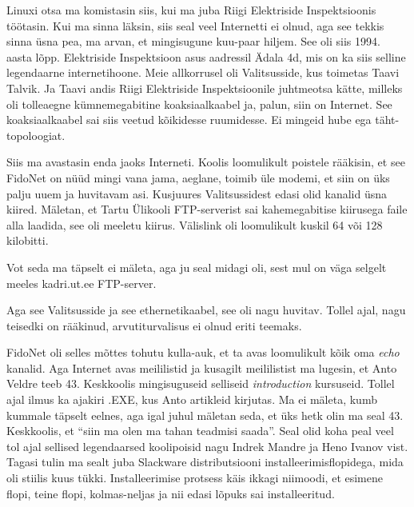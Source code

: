 
Linuxi otsa ma komistasin siis, kui ma juba Riigi Elektriside 
Inspektsioonis töötasin. Kui ma sinna 
läksin, siis seal veel Internetti ei olnud, aga see tekkis sinna üsna pea, ma 
arvan, et mingisugune kuu-paar hiljem. See oli siis 1994. aasta lõpp.  
Elektriside Inspektsioon asus aadressil Ädala 4d, mis on ka siis selline 
legendaarne internetihoone.  Meie allkorrusel oli 
Valitsusside, kus toimetas Taavi Talvik. Ja Taavi andis Riigi Elektriside Inspektsioonile juhtmeotsa kätte, 
milleks oli  tolleaegne kümnemegabitine koaksiaalkaabel ja, palun, siin on 
Internet. See koaksiaalkaabel sai siis veetud kõikidesse ruumidesse. Ei mingeid 
hube ega täht-topoloogiat.

Siis ma avastasin enda jaoks Interneti. Koolis loomulikult poistele rääkisin, et 
see FidoNet on nüüd mingi  vana jama, aeglane, toimib üle modemi, et siin on 
üks palju uuem ja huvitavam asi. Kusjuures  Valitsussidest edasi olid kanalid 
üsna kiired. Mäletan, et Tartu Ülikooli FTP-serverist sai kahemegabitise 
kiirusega faile alla laadida, see oli  meeletu kiirus. Välislink oli 
loomulikult kuskil 64 või 128 kilobitti. 


Vot seda ma täpselt ei mäleta, aga ju seal midagi oli, sest mul on väga selgelt 
meeles kadri.ut.ee  FTP-server. 

Aga see Valitsusside ja see ethernetikaabel, see oli nagu 
huvitav. Tollel ajal, nagu teisedki on rääkinud, arvutiturvalisus ei olnud 
eriti teemaks. 

FidoNet oli selles mõttes tohutu kulla-auk, et ta avas loomulikult kõik oma  
\emph{echo} kanalid. Aga Internet avas meililistid ja kusagilt meililistist ma 
lugesin, et Anto Veldre teeb 43. 
Keskkoolis mingisuguseid selliseid 
\emph{introduction} kursuseid. Tollel ajal ilmus ka ajakiri .EXE, 
kus Anto artikleid kirjutas. Ma ei mäleta, kumb kummale täpselt eelnes, aga 
igal juhul mäletan seda, et üks hetk olin ma seal 43. Keskkoolis, et 
\enquote{siin ma olen ma tahan teadmisi saada}. Seal olid koha peal veel tol 
ajal sellised legendaarsed koolipoisid nagu Indrek Mandre ja Heno Ivanov vist. Tagasi tulin ma sealt 
juba Slackware distributsiooni installeerimisflopidega, mida 
oli stiilis kuus tükki. Installeerimise protsess käis ikkagi niimoodi, et 
esimene flopi, teine flopi, kolmas-neljas ja nii edasi lõpuks sai 
installeeritud. 

